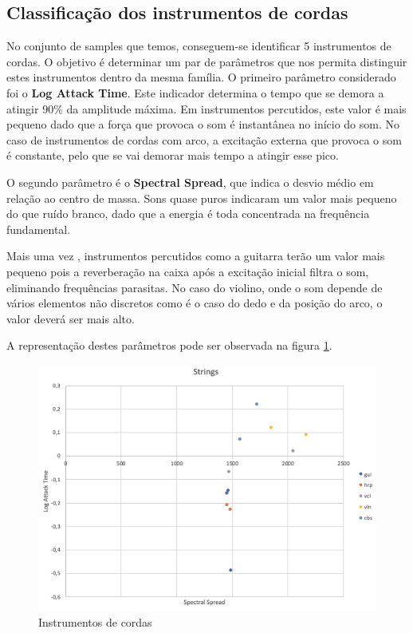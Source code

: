 \subsection{Classificação dos instrumentos de cordas}

No conjunto de samples que temos, conseguem-se identificar 5 instrumentos de cordas. O objetivo é determinar um par de parâmetros que nos permita distinguir estes instrumentos dentro da mesma família.
O primeiro parâmetro considerado foi o \textbf{Log Attack Time}. Este indicador determina o tempo que se demora a atingir 90\% da amplitude máxima.
Em instrumentos percutidos, este valor é mais pequeno dado que a força que provoca o som é instantânea no início do som.
No caso de instrumentos de cordas com arco, a excitação externa que provoca o som é constante, pelo que se vai demorar mais tempo a atingir esse pico.

O segundo parâmetro é o \textbf{Spectral Spread}, que indica o desvio médio em relação ao centro de massa.
Sons quase puros indicaram um valor mais pequeno do que ruído branco, dado que a energia é toda concentrada na frequência fundamental.

Mais uma vez , instrumentos percutidos como a guitarra terão um valor mais pequeno pois a reverberação na caixa após a excitação inicial filtra o som, eliminando frequências parasitas.
No caso do violino, onde o som depende de vários elementos não discretos como é o caso do dedo e da posição do arco, o valor deverá ser mais alto.

A representação destes parâmetros pode ser observada na figura \ref{fig:5}.

\begin{figure}[H]
    \centering
    \includegraphics[width=.8\linewidth]{figs/string_1.png}
    \caption{Instrumentos de cordas}
    \label{fig:5}
\end{figure}

